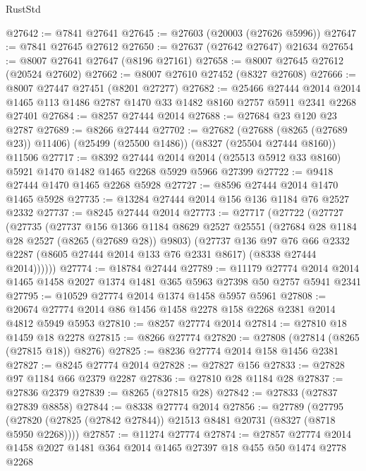 \begin{lexlean}{RustStd}
\begin{coremodule}
{\begin{coremodule}
{{{{{{{{{{{{{{{{{{{{{{{{{{{{{{{{{{{{{{{{{{{{{{{{{{{{{{@27642 := @7841 @27641
@27645 := @27603 (@20003 (@27626 @5996))
@27647 := @7841 @27645 @27612
@27650 := @27637 (@27642 @27647) @21634
@27654 := @8007 @27641 @27647 (@8196 @27161)
@27658 := @8007 @27645 @27612 (@20524 @27602)
@27662 := @8007 @27610 @27452 (@8327 @27608)
@27666 := @8007 @27447 @27451 (@8201 @27277)
@27682 := @25466
    @27444
    @2014
    @2014
    @1465
    @113
    @1486
    @2787
    @1470
    @33
    @1482
    @8160
    @2757
    @5911
    @2341
    @2268
    @27401
@27684 := @8257 @27444 @2014
@27688 := @27684 @23 @120 @23 @2787
@27689 := @8266 @27444
@27702 := @27682
    (@27688 (@8265 (@27689 @23)) @11406)
    (@25499 (@25500 @1486))
    (@8327 (@25504 @27444 @8160))
    @11506
@27717 := @8392
    @27444
    @2014
    @2014
    (@25513 @5912 @33 @8160)
    @5921
    @1470
    @1482
    @1465
    @2268
    @5929
    @5966
    @27399
@27722 := @9418 @27444 @1470 @1465 @2268 @5928
@27727 := @8596 @27444 @2014 @1470 @1465 @5928
@27735 := @13284 @27444 @2014 @156 @136 @1184 @76 @2527 @2332
@27737 := @8245 @27444 @2014
@27773 := @27717
    (@27722
      (@27727
        (@27735
          (@27737
            @156
            @1366
            @1184
            @8629
            @2527
            @25551
            (@27684 @28 @1184 @28 @2527 (@8265 (@27689 @28)) @9803)
            (@27737
              @136
              @97
              @76
              @66
              @2332
              @2287
              (@8605 @27444 @2014 @133 @76 @2331 @8617)
              (@8338 @27444 @2014))))))
@27774 := @18784 @27444
@27789 := @11179
    @27774
    @2014
    @2014
    @1465
    @1458
    @2027
    @1374
    @1481
    @365
    @5963
    @27398
    @50
    @2757
    @5941
    @2341
@27795 := @10529 @27774 @2014 @1374 @1458 @5957 @5961
@27808 := @20674 @27774 @2014 @86 @1456 @1458 @2278 @158 @2268 @2381 @2014 @4812 @5949 @5953
@27810 := @8257 @27774 @2014
@27814 := @27810 @18 @1459 @18 @2278
@27815 := @8266 @27774
@27820 := @27808 (@27814 (@8265 (@27815 @18)) @8276)
@27825 := @8236 @27774 @2014 @158 @1456 @2381
@27827 := @8245 @27774 @2014
@27828 := @27827 @156
@27833 := @27828 @97 @1184 @66 @2379 @2287
@27836 := @27810 @28 @1184 @28
@27837 := @27836 @2379
@27839 := @8265 (@27815 @28)
@27842 := @27833 (@27837 @27839 @8858)
@27844 := @8338 @27774 @2014
@27856 := @27789
    (@27795 (@27820 (@27825 (@27842 @27844)) @21513 @8481 @20731 (@8327 (@8718 @5950 @2268))))
@27857 := @11274 @27774
@27874 := @27857
    @27774
    @2014
    @1458
    @2027
    @1481
    @364
    @2014
    @1465
    @27397
    @18
    @455
    @50
    @1474
    @2778
    @2268
}}}}}}}}}}}}}}}}}}}}}}}}}}}}}}}}}}}}}}}}}}}}}}}}}}}}}}
\end{coremodule}}
\end{coremodule}
\end{lexlean}
